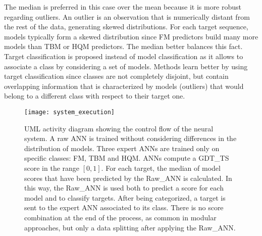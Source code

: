 The median is preferred in this case over the mean because it is more robust regarding outliers. An outlier is an observation that is numerically distant from the rest of the data, generating skewed distributions. For each target sequence, models typically form a skewed distribution since FM predictors build many more models than TBM or HQM predictors. The median better balances this fact.\\
Target classification is proposed instead of model classification as it allows to associate a class by considering a set of models. Methods learn better by using target classification since classes are not completely disjoint, but contain overlapping information that is characterized by models (outliers) that would belong to a different class with respect to their target one.
\begin{figure}[tb]
	\begin{center}
		\texttt{[image: system\_execution]}
		\caption[Control flow of the neural system]{UML activity diagram showing the control flow of the neural system. A raw ANN is trained without considering differences in the distribution of models. Three expert ANNs are trained only on specific classes: FM, TBM and HQM. ANNs compute a GDT\_TS score in the range $[0, 1]$. For each target, the median of model scores that have been predicted by the Raw\_ANN is calculated. In this way, the Raw\_ANN is used both to predict a score for each model and to classify targets. After being categorized, a target is sent to the expert ANN associated to its class. There is no score combination at the end of the process, as common in modular approaches, but only a data splitting after applying the Raw\_ANN.}
		\label{fig:system_execution}
	\end{center}
\end{figure}


